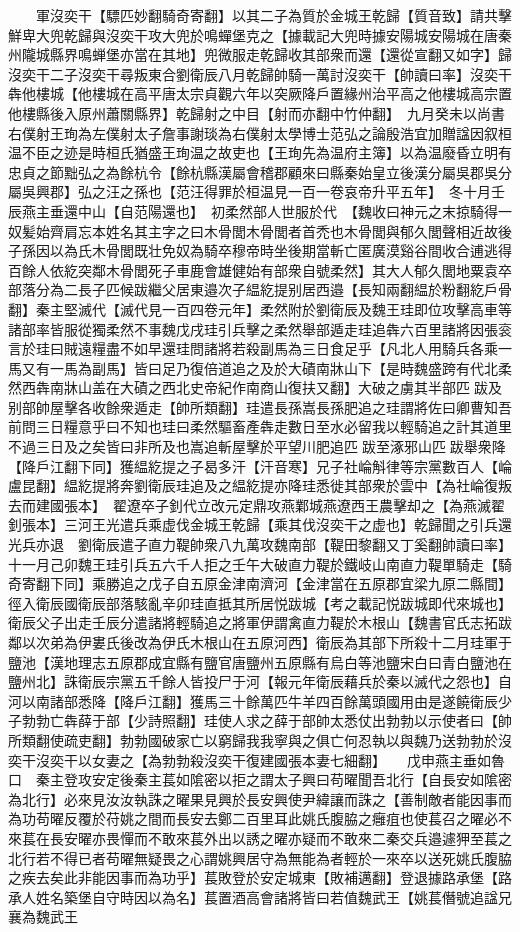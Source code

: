 　　軍沒奕干【驃匹妙翻騎奇寄翻】以其二子為質於金城王乾歸【質音致】請共擊鮮卑大兜乾歸與沒奕干攻大兜於鳴蟬堡克之【據載記大兜時據安陽城安陽城在唐秦州隴城縣界鳴蝉堡亦當在其地】兜微服走乾歸收其部衆而還【還從宣翻又如字】歸沒奕干二子沒奕干尋叛東合劉衛辰八月乾歸帥騎一萬討沒奕干【帥讀曰率】沒奕干犇他樓城【他樓城在高平唐太宗貞觀六年以突厥降戶置緣州治平高之他樓城高宗置他樓縣後入原州蕭關縣界】乾歸射之中目【射而亦翻中竹仲翻】　九月癸未以尚書右僕射王珣為左僕射太子詹事謝琰為右僕射太學博士范弘之論殷浩宜加贈諡因叙桓温不臣之迹是時桓氏猶盛王珣温之故吏也【王珣先為温府主簿】以為温廢昏立明有忠貞之節黜弘之為餘杭令【餘杭縣漢屬會稽郡顧來曰縣秦始皇立後漢分屬吳郡吳分屬吳興郡】弘之汪之孫也【范汪得罪於桓温見一百一卷哀帝升平五年】　冬十月壬辰燕主垂還中山【自范陽還也】　初柔然部人世服於代　【魏收曰神元之末掠騎得一奴髪始齊肩忘本姓名其主字之曰木骨閭木骨閭者首禿也木骨閭與郁久閭聲相近故後子孫因以為氏木骨閭既壮免奴為騎卒穆帝時坐後期當斬亡匿廣漠谿谷間收合逋逃得百餘人依紇突鄰木骨閭死子車鹿會雄健始有部衆自號柔然】其大人郁久閭地粟袁卒部落分為二長子匹候跋繼父居東邉次子緼紇提别居西邉【長知兩翻緼於粉翻紇戶骨翻】秦主堅滅代【滅代見一百四卷元年】柔然附於劉衛辰及魏王珪即位攻擊高車等諸部率皆服從獨柔然不事魏戊戌珪引兵擊之柔然舉部遁走珪追犇六百里諸將因張衮言於珪曰賊遠糧盡不如早還珪問諸將若殺副馬為三日食足乎【凡北人用騎兵各乘一馬又有一馬為副馬】皆曰足乃復倍道追之及於大磧南牀山下【是時魏盛跨有代北柔然西犇南牀山盖在大磧之西北史帝紀作南商山復扶又翻】大破之虜其半部匹跋及别部帥屋擊各收餘衆遁走【帥所類翻】珪遣長孫嵩長孫肥追之珪謂將佐曰卿曹知吾前問三日糧意乎曰不知也珪曰柔然驅畜產犇走數日至水必留我以輕騎追之計其道里不過三日及之矣皆曰非所及也嵩追斬屋擊於平望川肥追匹跋至涿邪山匹跋舉衆降【降戶江翻下同】獲緼紇提之子曷多汗【汗音寒】兄子社崘斛律等宗黨數百人【崘盧昆翻】緼紇提將奔劉衛辰珪追及之緼紇提亦降珪悉徙其部衆於雲中【為社崘復叛去而建國張本】　翟遼卒子釗代立改元定鼎攻燕鄴城燕遼西王農擊却之【為燕滅翟釗張本】三河王光遣兵乘虚伐金城王乾歸【乘其伐沒奕干之虚也】乾歸聞之引兵還光兵亦退　劉衛辰遣子直力鞮帥衆八九萬攻魏南部【鞮田黎翻又丁奚翻帥讀曰率】十一月己卯魏王珪引兵五六千人拒之壬午大破直力鞮於鐵岐山南直力鞮單騎走【騎奇寄翻下同】乘勝追之戊子自五原金津南濟河【金津當在五原郡宜梁九原二縣間】徑入衛辰國衛辰部落駭亂辛卯珪直抵其所居悦跋城【考之載記悦跋城即代來城也】衛辰父子出走壬辰分遣諸將輕騎追之將軍伊謂禽直力鞮於木根山【魏書官氏志拓跋鄰以次弟為伊婁氏後改為伊氏木根山在五原河西】衛辰為其部下所殺十二月珪軍于鹽池【漢地理志五原郡成宜縣有鹽官唐鹽州五原縣有烏白等池鹽宋白曰青白鹽池在鹽州北】誅衛辰宗黨五千餘人皆投尸于河【報元年衛辰藉兵於秦以滅代之怨也】自河以南諸部悉降【降戶江翻】獲馬三十餘萬匹牛羊四百餘萬頭國用由是遂饒衛辰少子勃勃亡犇薛于部【少詩照翻】珪使人求之薛于部帥太悉仗出勃勃以示使者曰【帥所類翻使疏吏翻】勃勃國破家亡以窮歸我我寧與之俱亡何忍執以與魏乃送勃勃於沒奕干沒奕干以女妻之【為勃勃殺沒奕干復建國張本妻七細翻】　　戊申燕主垂如魯口　秦主登攻安定後秦主萇如隂密以拒之謂太子興曰苟曜聞吾北行【自長安如隂密為北行】必來見汝汝執誅之曜果見興於長安興使尹緯讓而誅之【善制敵者能因事而為功苟曜反覆於苻姚之間而長安去鄭二百里耳此姚氏腹脇之癰疽也使萇召之曜必不來萇在長安曜亦畏憚而不敢來萇外出以誘之曜亦疑而不敢來二秦交兵邉遽狎至萇之北行若不得已者苟曜無疑畏之心謂姚興居守為無能為者輕於一來卒以送死姚氏腹脇之疾去矣此非能因事而為功乎】萇敗登於安定城東【敗補邁翻】登退據路承堡【路承人姓名築堡自守時因以為名】萇置酒高會諸將皆曰若值魏武王【姚萇僭號追諡兄襄為魏武王